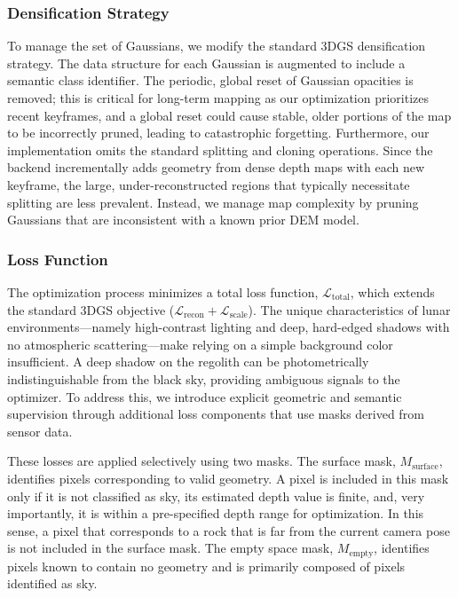 \subsubsection{Densification Strategy}
To manage the set of Gaussians, we modify the standard 3DGS densification strategy. The data structure for each Gaussian is augmented to include a semantic class identifier. The periodic, global reset of Gaussian opacities is removed; this is critical for long-term mapping as our optimization prioritizes recent keyframes, and a global reset could cause stable, older portions of the map to be incorrectly pruned, leading to catastrophic forgetting. Furthermore, our implementation omits the standard splitting and cloning operations. Since the backend incrementally adds geometry from dense depth maps with each new keyframe, the large, under-reconstructed regions that typically necessitate splitting are less prevalent. Instead, we manage map complexity by pruning Gaussians that are inconsistent with a known prior DEM model.

\subsubsection{Loss Function}
The optimization process minimizes a total loss function, $\mathcal{L}_{\text{total}}$, which extends the standard 3DGS objective ($\mathcal{L}_{\text{recon}} + \mathcal{L}_{\text{scale}}$). The unique characteristics of lunar environments—namely high-contrast lighting and deep, hard-edged shadows with no atmospheric scattering—make relying on a simple background color insufficient. A deep shadow on the regolith can be photometrically indistinguishable from the black sky, providing ambiguous signals to the optimizer. To address this, we introduce explicit geometric and semantic supervision through additional loss components that use masks derived from sensor data.

These losses are applied selectively using two masks. The surface mask, $M_{\text{surface}}$, identifies pixels corresponding to valid geometry. A pixel is included in this mask only if it is not classified as sky, its estimated depth value is finite, and, very importantly, it is within a pre-specified depth range for optimization.
In this sense, a pixel that corresponds to a rock that is far from the current camera pose is not included in the surface mask.
The empty space mask, $M_{\text{empty}}$, identifies pixels known to contain no geometry and is primarily composed of pixels identified as sky.

